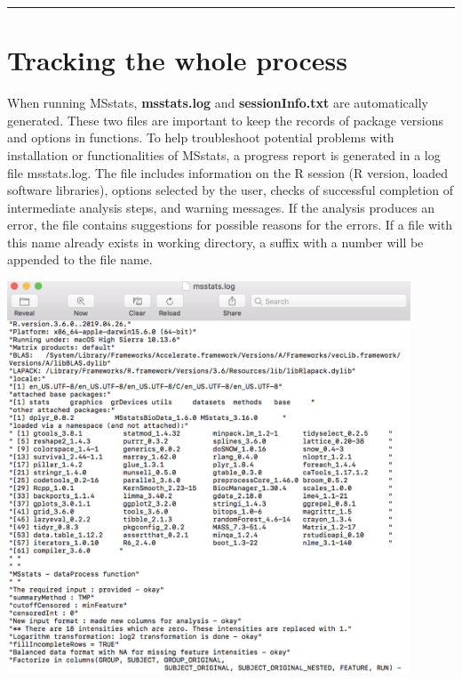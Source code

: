 \documentclass[]{book}
\begin{document}
\begin{center}\rule{0.5\linewidth}{\linethickness}\end{center}

\hypertarget{tracking-the-whole-process}{%
\section{Tracking the whole process}\label{tracking-the-whole-process}}

When running MSstats, \textbf{msstats.log} and \textbf{sessionInfo.txt} are automatically generated. These two files are important to keep the records of package versions and options in functions.
To help troubleshoot potential problems with installation or functionalities of MSstats, a progress report is generated in a log file msstats.log. The file includes information on the R session (R version, loaded software libraries), options selected by the user, checks of successful completion of intermediate analysis steps, and warning messages. If the analysis produces an error, the file contains suggestions for possible reasons for the errors. If a file with this name already exists in working directory, a suffix with a number will be appended to the file name.

\includegraphics[width=0.9\textwidth,height=\textheight]{img/logfileexample.png}
\end{document}
